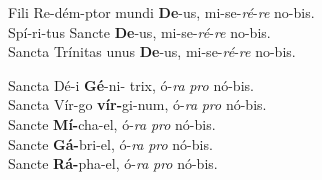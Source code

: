 
%
\begin{nstabbing}
\>Fili \>Re-\>dém-\>ptor mundi \>\>\textbf{De}-\>us, \>mi-\>se-\>\textit{ré}-\>\textit{re} \>no-\>bis.\\
\>Spí-\>ri-\>tus \>Sancte \>\>\textbf{De}-\>us, \>mi-\>se-\>\textit{ré}-\>\textit{re} \>no-\>bis.\\
\>Sancta \>\>Trínitas \>\>unus \>\textbf{De}-\>us, \>mi-\>se-\>\textit{ré}-\>\textit{re} \>no-\>bis.\\
\end{nstabbing}

\begin{nstabbing}
\>Sancta Dé-\>\>i \>\textbf{Gé}-\>ni- \>trix, \>ó-\>\textit{ra} \>\textit{pro} \>nó-\>bis.\\
\>Sancta Vír-\>\>go \>\textbf{vír-}\>gi-\>num, \>ó-\>\textit{ra} \>\textit{pro} \>nó-\>bis.\\
\>Sancte \>\>\>\textbf{Mí-}\>cha-\>el, \>ó-\>\textit{ra} \>\textit{pro} \>nó-\>bis.\\
\>Sancte \>\>\>\textbf{Gá-}\>bri-\>el, \>ó-\>\textit{ra} \>\textit{pro} \>nó-\>bis.\\
\>Sancte \>\>\>\textbf{Rá-}\>pha-\>el, \>ó-\>\textit{ra} \>\textit{pro} \>nó-\>bis.\\
\end{nstabbing}

